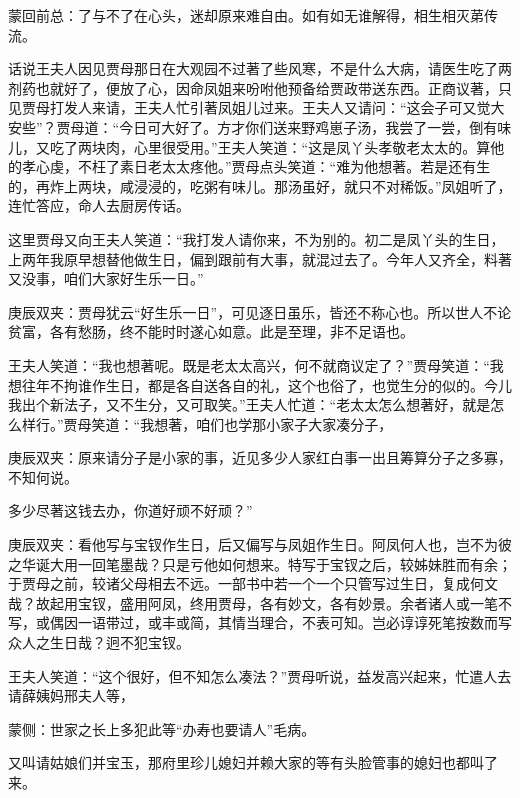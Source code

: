 \begin{parag}
    \begin{note}蒙回前总：了与不了在心头，迷却原来难自由。如有如无谁解得，相生相灭苐传流。\end{note}
\end{parag}


\begin{parag}
    话说王夫人因见贾母那日在大观园不过著了些风寒，不是什么大病，请医生吃了两剂药也就好了，便放了心，因命凤姐来吩咐他预备给贾政带送东西。正商议著，只见贾母打发人来请，王夫人忙引著凤姐儿过来。王夫人又请问：“这会子可又觉大安些”？贾母道：“今日可大好了。方才你们送来野鸡崽子汤，我尝了一尝，倒有味儿，又吃了两块肉，心里很受用。”王夫人笑道：“这是凤丫头孝敬老太太的。算他的孝心虔，不枉了素日老太太疼他。”贾母点头笑道：“难为他想著。若是还有生的，再炸上两块，咸浸浸的，吃粥有味儿。那汤虽好，就只不对稀饭。”凤姐听了，连忙答应，命人去厨房传话。
\end{parag}


\begin{parag}
    这里贾母又向王夫人笑道：“我打发人请你来，不为别的。初二是凤丫头的生日，上两年我原早想替他做生日，偏到跟前有大事，就混过去了。今年人又齐全，料著又没事，咱们大家好生乐一日。”\begin{note}庚辰双夹：贾母犹云“好生乐一日”，可见逐日虽乐，皆还不称心也。所以世人不论贫富，各有愁肠，终不能时时遂心如意。此是至理，非不足语也。\end{note}王夫人笑道：“我也想著呢。既是老太太高兴，何不就商议定了？”贾母笑道：“我想往年不拘谁作生日，都是各自送各自的礼，这个也俗了，也觉生分的似的。今儿我出个新法子，又不生分，又可取笑。”王夫人忙道：“老太太怎么想著好，就是怎么样行。”贾母笑道：“我想著，咱们也学那小家子大家凑分子，\begin{note}庚辰双夹：原来请分子是小家的事，近见多少人家红白事一出且筹算分子之多寡，不知何说。\end{note}多少尽著这钱去办，你道好顽不好顽？”\begin{note}庚辰双夹：看他写与宝钗作生日，后又偏写与凤姐作生日。阿凤何人也，岂不为彼之华诞大用一回笔墨哉？只是亏他如何想来。特写于宝钗之后，较姊妹胜而有余；于贾母之前，较诸父母相去不远。一部书中若一个一个只管写过生日，复成何文哉？故起用宝钗，盛用阿凤，终用贾母，各有妙文，各有妙景。余者诸人或一笔不写，或偶因一语带过，或丰或简，其情当理合，不表可知。岂必谆谆死笔按数而写众人之生日哉？迥不犯宝钗。\end{note}王夫人笑道：“这个很好，但不知怎么凑法？”贾母听说，益发高兴起来，忙遣人去请薛姨妈邢夫人等，\begin{note}蒙侧：世家之长上多犯此等“办寿也要请人”毛病。\end{note}又叫请姑娘们并宝玉，那府里珍儿媳妇并赖大家的等有头脸管事的媳妇也都叫了来。
\end{parag}


